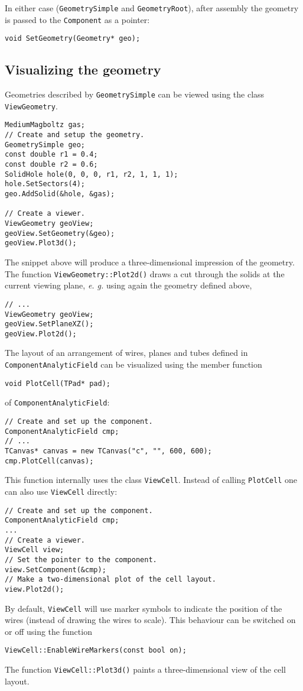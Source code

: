 In either case (\texttt{GeometrySimple} and \texttt{GeometryRoot}),
after assembly the geometry is passed to the \texttt{Component} as a pointer:
\begin{lstlisting}
void SetGeometry(Geometry* geo);
\end{lstlisting}

\subsection{Visualizing the geometry}

Geometries described by \texttt{GeometrySimple} can be viewed 
using the class \texttt{ViewGeometry}. 
\begin{lstlisting}
MediumMagboltz gas;
// Create and setup the geometry.
GeometrySimple geo;
const double r1 = 0.4;
const double r2 = 0.6;
SolidHole hole(0, 0, 0, r1, r2, 1, 1, 1);
hole.SetSectors(4);
geo.AddSolid(&hole, &gas);

// Create a viewer.
ViewGeometry geoView;
geoView.SetGeometry(&geo);
geoView.Plot3d();
\end{lstlisting}
The snippet above will produce a three-dimensional impression of the geometry.
The function \texttt{ViewGeometry::Plot2d()} draws a cut through the solids 
at the current viewing plane, \textit{e. g.} using again the geometry defined above,
\begin{lstlisting}
// ...
ViewGeometry geoView;
geoView.SetPlaneXZ();
geoView.Plot2d();
\end{lstlisting} 


The layout of an arrangement of wires, planes and tubes
defined in \texttt{ComponentAnalyticField} can be visualized using 
the member function
\begin{lstlisting}
void PlotCell(TPad* pad);
\end{lstlisting}
of \texttt{ComponentAnalyticField}:
\begin{lstlisting}
// Create and set up the component.
ComponentAnalyticField cmp;
// ...
TCanvas* canvas = new TCanvas("c", "", 600, 600);
cmp.PlotCell(canvas); 
\end{lstlisting}
This function internally uses the class \texttt{ViewCell}.
Instead of calling \texttt{PlotCell} one can also use \texttt{ViewCell} directly:
\begin{lstlisting}
// Create and set up the component.
ComponentAnalyticField cmp;
... 
// Create a viewer.
ViewCell view;
// Set the pointer to the component.
view.SetComponent(&cmp);
// Make a two-dimensional plot of the cell layout.
view.Plot2d();
\end{lstlisting}
By default, \texttt{ViewCell} will use marker symbols to indicate the position of the wires (instead of drawing the wires to scale). 
This behaviour can be switched on or off using the function
\begin{lstlisting}
ViewCell::EnableWireMarkers(const bool on);
\end{lstlisting} 
The function \texttt{ViewCell::Plot3d()} paints
a three-dimensional view of the cell layout.

